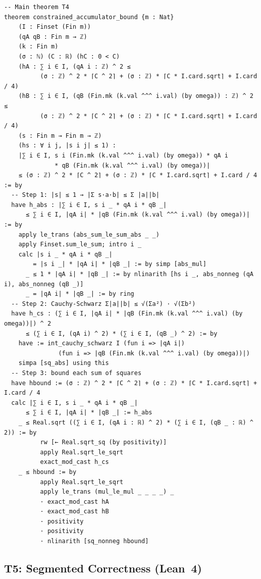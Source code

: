 \documentclass[11pt,a4paper]{article}
\theoremstyle{definition}
\theoremstyle{plain}
\theoremstyle{remark}
\begin{document}
\begin{leanblock}
\begin{lstlisting}[language={}]
-- Main theorem T4
theorem constrained_accumulator_bound {m : Nat}
    (I : Finset (Fin m))
    (qA qB : Fin m → ℤ)
    (k : Fin m)
    (σ : ℕ) (C : ℝ) (hC : 0 < C)
    (hA : ∑ i ∈ I, (qA i : ℤ) ^ 2 ≤
          (σ : ℤ) ^ 2 * ⌈C ^ 2⌉ + (σ : ℤ) * ⌈C * I.card.sqrt⌉ + I.card / 4)
    (hB : ∑ i ∈ I, (qB (Fin.mk (k.val ^^^ i.val) (by omega)) : ℤ) ^ 2 ≤
          (σ : ℤ) ^ 2 * ⌈C ^ 2⌉ + (σ : ℤ) * ⌈C * I.card.sqrt⌉ + I.card / 4)
    (s : Fin m → Fin m → ℤ)
    (hs : ∀ i j, |s i j| ≤ 1) :
    |∑ i ∈ I, s i (Fin.mk (k.val ^^^ i.val) (by omega)) * qA i
              * qB (Fin.mk (k.val ^^^ i.val) (by omega))|
    ≤ (σ : ℤ) ^ 2 * ⌈C ^ 2⌉ + (σ : ℤ) * ⌈C * I.card.sqrt⌉ + I.card / 4 := by
  -- Step 1: |s| ≤ 1 → |Σ s·a·b| ≤ Σ |a||b|
  have h_abs : |∑ i ∈ I, s i _ * qA i * qB _|
      ≤ ∑ i ∈ I, |qA i| * |qB (Fin.mk (k.val ^^^ i.val) (by omega))| := by
    apply le_trans (abs_sum_le_sum_abs _ _)
    apply Finset.sum_le_sum; intro i _
    calc |s i _ * qA i * qB _|
        = |s i _| * |qA i| * |qB _| := by simp [abs_mul]
      _ ≤ 1 * |qA i| * |qB _| := by nlinarith [hs i _, abs_nonneg (qA i), abs_nonneg (qB _)]
      _ = |qA i| * |qB _| := by ring
  -- Step 2: Cauchy-Schwarz Σ|a||b| ≤ √(Σa²) · √(Σb²)
  have h_cs : (∑ i ∈ I, |qA i| * |qB (Fin.mk (k.val ^^^ i.val) (by omega))|) ^ 2
      ≤ (∑ i ∈ I, (qA i) ^ 2) * (∑ i ∈ I, (qB _) ^ 2) := by
    have := int_cauchy_schwarz I (fun i => |qA i|)
               (fun i => |qB (Fin.mk (k.val ^^^ i.val) (by omega))|)
    simpa [sq_abs] using this
  -- Step 3: bound each sum of squares
  have hbound := (σ : ℤ) ^ 2 * ⌈C ^ 2⌉ + (σ : ℤ) * ⌈C * I.card.sqrt⌉ + I.card / 4
  calc |∑ i ∈ I, s i _ * qA i * qB _|
      ≤ ∑ i ∈ I, |qA i| * |qB _| := h_abs
    _ ≤ Real.sqrt ((∑ i ∈ I, (qA i : ℝ) ^ 2) * (∑ i ∈ I, (qB _ : ℝ) ^ 2)) := by
          rw [← Real.sqrt_sq (by positivity)]
          apply Real.sqrt_le_sqrt
          exact_mod_cast h_cs
    _ ≤ hbound := by
          apply Real.sqrt_le_sqrt
          apply le_trans (mul_le_mul _ _ _ _) _
          · exact_mod_cast hA
          · exact_mod_cast hB
          · positivity
          · positivity
          · nlinarith [sq_nonneg hbound]
\end{lstlisting}
\end{leanblock}

\subsection{T5: Segmented Correctness (Lean~4)}
\end{document}
